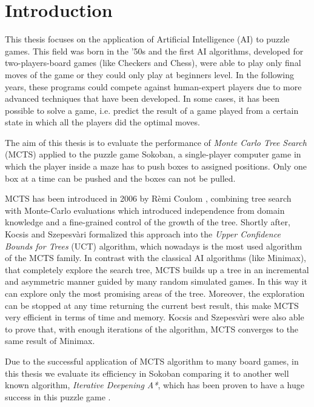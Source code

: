 \chapter{Introduction}
\label{Introduzione}
This thesis focuses on the application of Artificial Intelligence (AI) to puzzle games. This field was born in the ’50s and the first AI algorithms, developed for two-players-board games (like Checkers and Chess), were able to play only final moves of the game or they could only play at beginners level. In the following years, these programs could compete against human-expert players due to more advanced techniques that have been developed. In some cases, it has been possible to solve a game, i.e. predict the result of a game played from a certain state in which all the players did the optimal moves.

\medskip\noindent
The aim of this thesis is to evaluate the performance of \textit{Monte Carlo Tree Search} (MCTS) applied to the puzzle game Sokoban, a single-player computer game in which the player inside a maze has to push boxes to assigned positions. Only one box at a time can be pushed and the boxes can not be pulled.

\medskip\noindent
MCTS has been introduced in 2006 by Rèmi Coulom \cite{coulom:inria-00116992}, combining tree search with Monte-Carlo evaluations which introduced independence from domain knowledge and a fine-grained control of the growth of the tree. Shortly after, Kocsis and Szepesvàri \cite{Kocsis:2006:BBM:2091602.2091633} formalized this approach into the \textit{Upper Confidence Bounds for Trees} (UCT) algorithm, which nowadays is the most used algorithm of the MCTS family. In contrast with the classical AI algorithms (like Minimax), that completely explore the search tree, MCTS builds up a tree in an incremental and asymmetric manner guided by many random simulated games. In this way it can explore only the most promising areas of the tree. Moreover, the exploration can be stopped at any time returning the current best result, this make MCTS very efficient in terms of time and memory. Kocsis and Szepesvàri were also able to prove that, with enough iterations of the algorithm, MCTS converges to the same result of Minimax.

\medskip\noindent
Due to the successful application of MCTS algorithm to many board games, in this thesis we evaluate its efficiency in Sokoban comparing it to another well known algorithm, \textit{Iterative Deepening A*}, which has been proven to have a huge success in this puzzle game \cite{Junghanns99pushingthe}.

